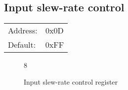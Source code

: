 \documentclass{article}
\begin{document}
	\subsection{Input slew-rate control}

	\begin{tabular}{ l c }
		Address: & 0x0D \\
		Default: & 0xFF \\
	\end{tabular}

	\begin{figure}[H]
		\centering
		\begin{bytefield}[
			bitwidth=0.1\linewidth]{8}
			 \\
		\end{bytefield}
		\caption{Input slew-rate control register}
		\label{reg:input_slew}
	\end{figure}
\end{document}

